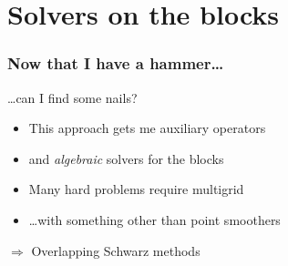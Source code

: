 \documentclass[presentation,aspectratio=43, 10pt]{beamer}
\begin{document}
\section{Solvers on the blocks}

\begin{frame}
  \frametitle{Now that I have a hammer\ldots}
  \ldots can I find some nails?

  \begin{itemize}
  \item This approach gets me auxiliary operators
  \item and \emph{algebraic} solvers for the blocks
  \item Many hard problems require multigrid 
  \item \dots with something other than point smoothers
  \end{itemize}
  \pause

  \begin{center}
    $\Rightarrow$ Overlapping Schwarz methods
  \end{center}
\end{frame}
\end{document}
